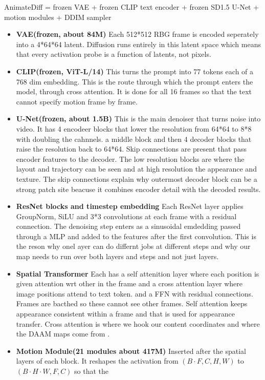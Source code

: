 \documentclass[twoside,english]{article}
\begin{document}
AnimateDiff = frozen VAE + frozen CLIP text encoder + frozen SD1.5 U-Net + motion modules + DDIM sampler
\begin{itemize}
\item\textbf{VAE(frozen, about 84M)} Each 512*512 RBG frame is encoded seperately into a 4*64*64 latent. 
Diffusion runs entirely in this latent space which means that every activation probe is a function of latents, not pixels.
\item\textbf{CLIP(frozen, ViT-L/14)} This turns the prompt into 77 tokens each of a 768 dim embedding. 
This is the route through which the prompt enters the model, through cross attention. It is done for all 16 frames
so that the text cannot specify motion frame by frame. 
\item\textbf{U-Net(frozen, about 1.5B)} This is the main denoiser that turns noise into video. 
It has 4 encodeer blocks that lower the resolution from 64*64 to 8*8 with doubling the cahnnels. 
a middle block and then 4 decoder blocks that raise the resolution back to 64*64. Skip connections 
are present that pass encoder features to the decoder. The low resolution blocks are where the 
layout and trajectory can be seen and at high resolution the appearance and texture. 
The skip connections explain why outermost decoder block can be a strong patch site beacuse it combines encoder
detail with the decoded results. 
\item\textbf{ResNet blocks and timestep embedding} Each ResNet layer applies GroupNorm, SiLU and 3*3 convolutions
at each frame with a residual connection. The denoising step enters as a sinusoidal emdedding 
passed through a MLP and added to the features after the first convolution. This is the reson why 
onel ayer can do differnt jobs at different steps and why our map needs to run over both layers and 
steps and not just layers. 
\item\textbf{Spatial Transformer} Each has a self attenition layer where each position is given 
attention wrt other in the frame and a cross attention layer where image positions attend to text token.
and a FFN with residual connections. Frames are bacthed so these cannot see other frames. 
Self attention keeps appearance consistent within a frame and that is used for appearance transfer.
Cross attention is where we hook our content coordinates and where the DAAM maps come from . 
\item\textbf{Motion Module(21 modules about 417M)} Inserted after the spatial layers of each block.
It reshapes the activation from $(B\cdot F, C, H, W)$ to $(B\cdot H\cdot W, F, C)$ so that the 

\end{itemize}
\end{document}
